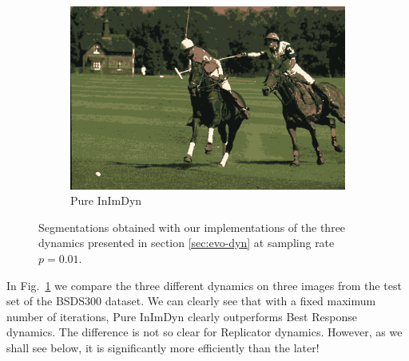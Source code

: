 \documentclass[11pt,a4paper]{article}
\begin{document}
\begin{figure}
\begin{subfigure}[b]{0.3\textwidth}
        \includegraphics[width=\textwidth]{figures/methods/inimdyn/361010_avg.png}
        \caption{Pure InImDyn}
    \end{subfigure}
       \caption{Segmentations obtained with our implementations of the three dynamics presented in section \ref{sec:evo-dyn} at sampling rate $p=0.01$.}
       \label{fig:results-dynamics}
\end{figure}

In Fig.~\ref{fig:results-dynamics} we compare the three different dynamics on three images from the test set of the BSDS300 dataset. We can clearly see that with a fixed maximum number of iterations, Pure InImDyn clearly outperforms Best Response dynamics. The difference is not so clear for Replicator dynamics. However, as we shall see below, it is significantly more efficiently than the later!
\end{document}
